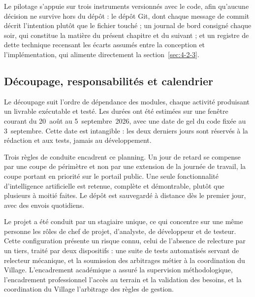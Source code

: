 Le pilotage s'appuie sur trois instruments versionnés avec le code, afin qu'aucune décision ne survive hors du dépôt : le dépôt Git, dont chaque message de commit décrit l'intention plutôt que le fichier touché ; un journal de bord consigné chaque soir, qui constitue la matière du présent chapitre et du suivant ; et un registre de dette technique recensant les écarts assumés entre la conception et l'implémentation, qui alimente directement la section~\ref{sec:4-2-3}.

\subsection{Découpage, responsabilités et calendrier}

Le découpage suit l'ordre de dépendance des modules, chaque activité produisant un livrable exécutable et testé. Les durées ont été estimées sur une fenêtre courant du 20~août au 5~septembre~2026, avec une date de gel du code fixée au 3~septembre. Cette date est intangible : les deux derniers jours sont réservés à la rédaction et aux tests, jamais au développement.

Trois règles de conduite encadrent ce planning. Un jour de retard se compense par une coupe de périmètre et non par une extension de la journée de travail, la coupe portant en priorité sur le portail public. Une seule fonctionnalité d'intelligence artificielle est retenue, complète et démontrable, plutôt que plusieurs à moitié faites. Le dépôt est sauvegardé à distance dès le premier jour, avec des envois quotidiens.

Le projet a été conduit par un stagiaire unique, ce qui concentre sur une même personne les rôles de chef de projet, d'analyste, de développeur et de testeur. Cette configuration présente un risque connu, celui de l'absence de relecture par un tiers, traité par deux dispositifs : une suite de tests automatisés servant de relecteur mécanique, et la soumission des arbitrages métier à la coordination du Village. L'encadrement académique a assuré la supervision méthodologique, l'encadrement professionnel l'accès au terrain et la validation des besoins, et la coordination du Village l'arbitrage des règles de gestion.

